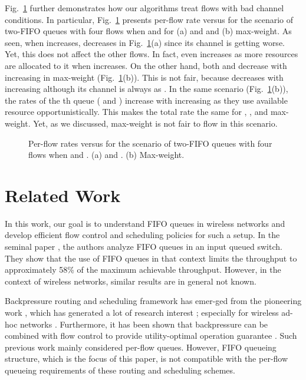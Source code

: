 \documentclass[conference]{IEEEtran}
\begin{document}
Fig.~\ref{fig:sim_4} further demonstrates how our algorithms treat flows with bad channel conditions. In particular, Fig.~\ref{fig:sim_4} presents per-flow rate versus  for the scenario of two-FIFO queues with four flows when  and  for (a)  and  and (b) max-weight. As seen, when  increases,  decreases in Fig.~\ref{fig:sim_4}(a) since its channel is getting worse. Yet, this does not affect the other flows. In fact,  even increases as more resources are allocated to it when  increases. On the other hand, both  and  decrease with increasing  in max-weight (Fig.~\ref{fig:sim_4}(b)). This is not fair, because  decreases with increasing  although its channel is always  as . In the same scenario (Fig.~\ref{fig:sim_4}(b)), the rates of the th queue ( and ) increase with increasing  as they use available resource opportunistically. This makes the total rate the same for , , and max-weight. Yet, as we discussed, max-weight is not fair to flow  in this scenario. 



\begin{figure}
\centering
{} \hspace{-20pt}
\vspace{-10pt}
\caption{Per-flow rates versus  for the scenario of two-FIFO queues with four flows when  and . (a)  and . (b) Max-weight.}
\label{fig:sim_4}
\vspace{-5pt}
\end{figure}


\section{Related Work}\label{sec:related}
In this work, our goal is to understand FIFO queues in wireless networks and develop efficient flow control and scheduling policies for such a setup. In the seminal paper \cite{Karol87}, the authors analyze FIFO queues in an input queued switch. They show that the use of FIFO queues in that context limits the throughput to approximately 58\% of the maximum achievable throughput. However, in the context of wireless networks, similar results are in general not known.

Backpressure routing and scheduling framework has emer-ged from the pioneering work \cite{tass_eph1,tass_eph2}, which has generated a lot of research interest \cite{neely_book}; especially for wireless ad-hoc networks \cite{tass3,kahale,andrews,neely_mod_pow,stolyar_greedy,liu_stolyar}. Furthermore, it has been shown that backpressure can be combined with flow control to provide utility-optimal operation guarantee \cite{neely_mod,stolyar_greedy}. Such previous work mainly considered per-flow queues. However, FIFO queueing structure, which is the focus of this paper, is not compatible with the per-flow queueing requirements of these routing and scheduling schemes.
\end{document}
